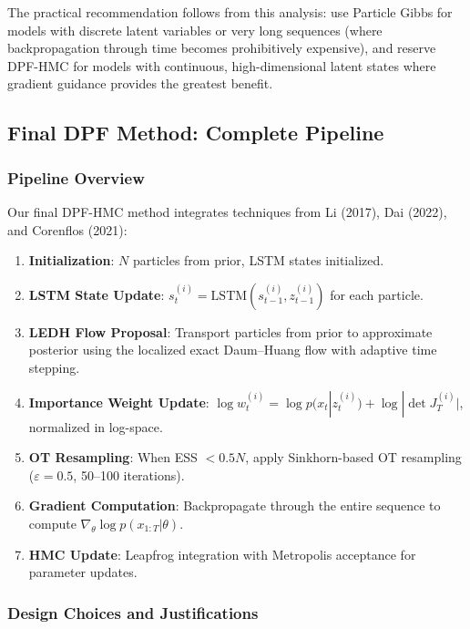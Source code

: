 \documentclass[12pt,a4paper]{article}
\theoremstyle{definition}
\theoremstyle{remark}
\begin{document}
The practical recommendation follows from this analysis: use Particle Gibbs for models with discrete latent variables or very long sequences (where backpropagation through time becomes prohibitively expensive), and reserve DPF-HMC for models with continuous, high-dimensional latent states where gradient guidance provides the greatest benefit.


\subsection{Final DPF Method: Complete Pipeline}

\subsubsection{Pipeline Overview}

Our final DPF-HMC method integrates techniques from Li (2017), Dai (2022), and Corenflos (2021):

\begin{enumerate}
	\item \textbf{Initialization}: $N$ particles from prior, LSTM states initialized.
	\item \textbf{LSTM State Update}: $s_t^{(i)} = \text{LSTM}(s_{t-1}^{(i)}, z_{t-1}^{(i)})$ for each particle.
	\item \textbf{LEDH Flow Proposal}: Transport particles from prior to approximate posterior using the localized exact Daum--Huang flow with adaptive time stepping.
	\item \textbf{Importance Weight Update}: $\log w_t^{(i)} = \log p(x_t | z_t^{(i)}) + \log |\det J_T^{(i)}|$, normalized in log-space.
	\item \textbf{OT Resampling}: When ESS $< 0.5N$, apply Sinkhorn-based OT resampling ($\varepsilon = 0.5$, 50--100 iterations).
	\item \textbf{Gradient Computation}: Backpropagate through the entire sequence to compute $\nabla_\theta \log p(x_{1:T} | \theta)$.
	\item \textbf{HMC Update}: Leapfrog integration with Metropolis acceptance for parameter updates.
\end{enumerate}

\subsubsection{Design Choices and Justifications}
\end{document}
